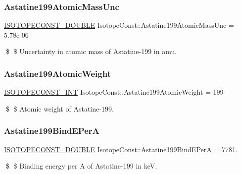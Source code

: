 \subsubsection{\texorpdfstring{Astatine199\+Atomic\+Mass\+Unc}{Astatine199AtomicMassUnc}}
{\footnotesize\ttfamily \mbox{\hyperlink{group___isotope_const-_macros_ga8f45a7272ce02c0b4c65c44636ed719a}{I\+S\+O\+T\+O\+P\+E\+C\+O\+N\+S\+T\+\_\+\+D\+O\+U\+B\+LE}} Isotope\+Const\+::\+Astatine199\+Atomic\+Mass\+Unc = 5.\+78e-\/06}

\$ \$ Uncertainty in atomic mass of Astatine-\/199 in amu. \mbox{\label{group___isotope_const-_astatine-_at199_ga3ac86893a672118309be55cc4cb342d4}} 
\subsubsection{\texorpdfstring{Astatine199\+Atomic\+Weight}{Astatine199AtomicWeight}}
{\footnotesize\ttfamily \mbox{\hyperlink{group___isotope_const-_macros_ga5f18360b3e99483a35c32d789e62621c}{I\+S\+O\+T\+O\+P\+E\+C\+O\+N\+S\+T\+\_\+\+I\+NT}} Isotope\+Const\+::\+Astatine199\+Atomic\+Weight = 199}

\$ \$ Atomic weight of Astatine-\/199. \mbox{\label{group___isotope_const-_astatine-_at199_gaa0da8813ae6f138f6da660a457fbf6ee}} 
\subsubsection{\texorpdfstring{Astatine199\+Bind\+E\+PerA}{Astatine199BindEPerA}}
{\footnotesize\ttfamily \mbox{\hyperlink{group___isotope_const-_macros_ga8f45a7272ce02c0b4c65c44636ed719a}{I\+S\+O\+T\+O\+P\+E\+C\+O\+N\+S\+T\+\_\+\+D\+O\+U\+B\+LE}} Isotope\+Const\+::\+Astatine199\+Bind\+E\+PerA = 7781.}

\$ \$ Binding energy per A of Astatine-\/199 in keV. \mbox{\label{group___isotope_const-_astatine-_at199_gad5e9d62a5e480b4821f3860af3c6070c}} 
